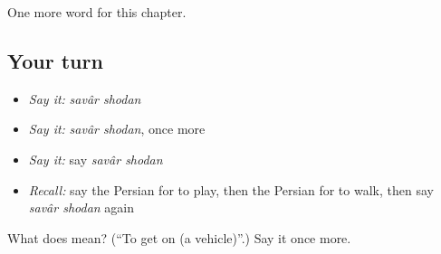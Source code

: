 \begin{grammarlens}[title={What you've built}]
One more word for this chapter.
\end{grammarlens}

\subsection*{Your turn}
\begin{itemize}
\raggedright
  \item \emph{Say it:} \emph{savâr shodan}
  \item \emph{Say it:} \emph{savâr shodan}, once more
  \item \emph{Say it:} say \emph{savâr shodan}
  \item \emph{Recall:} say the Persian for to play, then the Persian for to walk, then say \emph{savâr shodan} again
\end{itemize}

\begin{tcolorbox}[breakable,colback=teal!4,colframe=teal!35!black,title={Before you move on}]
What does   mean? (\textquotedblleft{}To get on (a vehicle)\textquotedblright{}.) Say it once more.
\end{tcolorbox}
